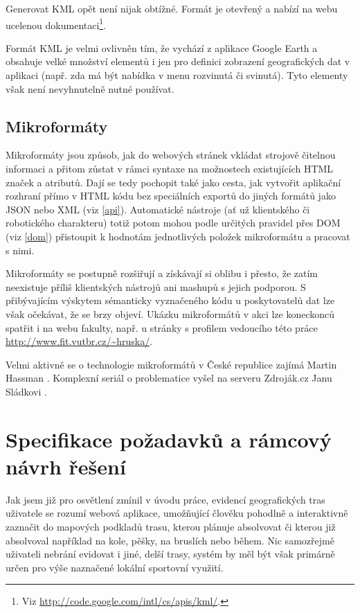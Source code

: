 Generovat KML opět není nijak obtížné. Formát je otevřený a nabízí na
webu ucelenou dokumentaci\footnote{Viz
\url{http://code.google.com/intl/cs/apis/kml/}.}.

Formát KML je velmi ovlivněn tím, že vychází z aplikace Google Earth
a obsahuje velké množství elementů i jen pro definici zobrazení
geografických dat v aplikaci (např. zda má být nabídka v menu
rozvinutá či svinutá). Tyto elementy však není nevyhnutelně nutné
používat.

\section{Mikroformáty}\label{microformats}
Mikroformáty jsou způsob, jak do webových stránek vkládat strojově
čitelnou informaci a přitom zůstat v rámci syntaxe na možnostech
existujících HTML značek a atributů. Dají se tedy pochopit také jako
cesta, jak vytvořit aplikační rozhraní přímo v HTML kódu bez
speciálních exportů do jiných formátů jako JSON nebo XML (viz
\ref{api}). Automatické nástroje (ať už klientského či robotického
charakteru) totiž potom mohou podle určitých pravidel přes DOM (viz
\ref{dom}) přistoupit k hodnotám jednotlivých položek
mikroformátu a pracovat s nimi.

Mikroformáty se postupně rozšiřují a získávají si oblibu i přesto, že
zatím neexistuje příliš klientských nástrojů ani mashupů s jejich
podporou. S přibývajícím výskytem sémanticky vyznačeného kódu u
poskytovatelů dat lze však očekávat, že se brzy objeví. Ukázku
mikroformátů v akci lze koneckonců spatřit i na webu
fakulty, např. u stránky s profilem vedoucího této práce
\url{http://www.fit.vutbr.cz/~hruska/}.

Velmi aktivně se o technologie mikroformátů v České republice zajímá
Martin Hassman \cite{mfLupa}. Komplexní seriál o problematice vyšel
na serveru Zdroják.cz Janu Sládkovi \cite{mf}.

\chapter{Specifikace požadavků a rámcový návrh řešení}

Jak jsem již pro osvětlení zmínil v úvodu práce, evidencí
geografických tras uživatele se rozumí webová aplikace, umožňující
člověku pohodlně a interaktivně zaznačit do mapových podkladů trasu,
kterou plánuje absolvovat či kterou již absolvoval například na kole,
pěšky, na bruslích nebo během. Nic samozřejmě uživateli nebrání
evidovat i jiné, delší trasy, systém by měl být však primárně určen
pro výše naznačené lokální sportovní využití.

